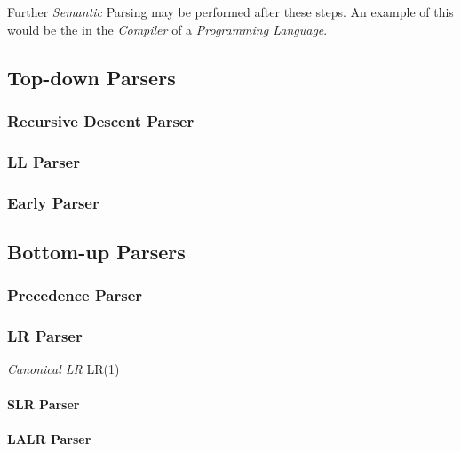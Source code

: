 \documentclass{article}
\begin{document}
Further \emph{Semantic} Parsing may be performed after these steps. An
example of this would be the in the \emph{Compiler} of a
\emph{Programming Language}.

\subsection{Top-down Parsers}

\subsubsection{Recursive Descent Parser}

\subsubsection{LL Parser}

\subsubsection{Early Parser}

\subsection{Bottom-up Parsers}

\subsubsection{Precedence Parser}

\subsubsection{LR Parser}

\emph{Canonical LR} LR(1)

\paragraph{SLR Parser}

\paragraph{LALR Parser}
\end{document}
